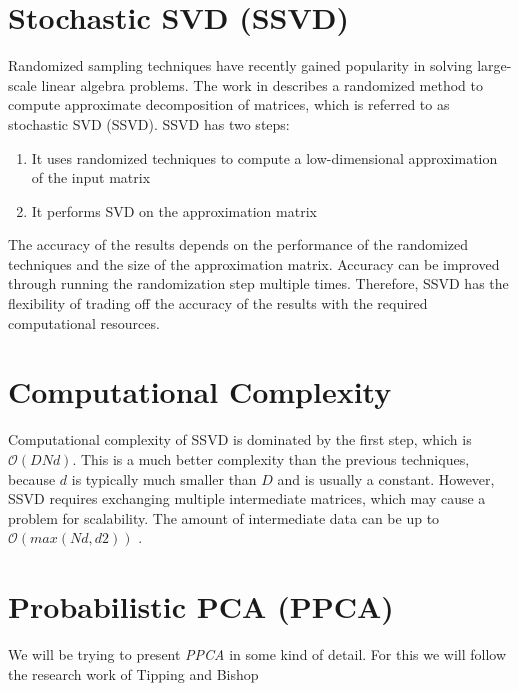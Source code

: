 \section{Stochastic SVD (SSVD)}
Randomized sampling techniques have recently gained popularity in solving large-scale linear algebra problems. The work in \cite{halko} describes a randomized method to compute approximate decomposition of matrices, which is referred to as stochastic SVD (SSVD). SSVD has two steps: 
\begin{enumerate}
\item It uses randomized techniques to compute a low-dimensional approximation of the input matrix
\item It performs SVD on the approximation matrix
\end{enumerate}
The accuracy of the results depends on the performance of the randomized techniques and the size of the approximation matrix. Accuracy can be improved through running the randomization step multiple times. Therefore, SSVD has the flexibility of trading off the accuracy of the results with the required computational resources.

\section{Computational Complexity}
Computational complexity of SSVD is dominated by the first step, which is $\mathcal{O}(DNd)$. This is a much better complexity than the previous techniques, because $d$ is typically much smaller than $D$ and is usually a constant. However, SSVD requires exchanging multiple intermediate matrices, which may cause a problem for scalability. The amount of intermediate data can be up to $\mathcal{O}(max(Nd,d2))$ \cite{elgamal}.
\section{Probabilistic PCA (PPCA)}
We will be trying to present \textit{PPCA} in some kind of detail. For this we will follow the research work of Tipping and Bishop \cite{bishop}
